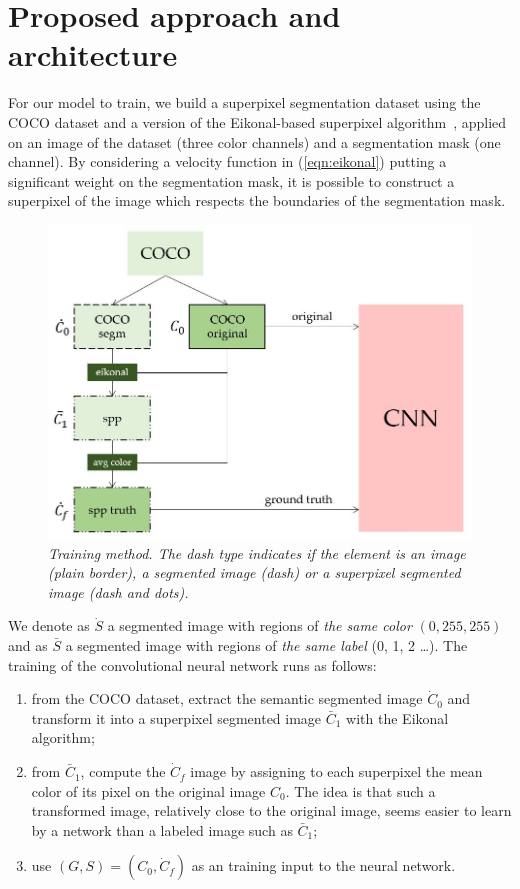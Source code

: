 \documentclass{article}
\begin{document}
\section{Proposed approach and architecture\label{s3}}
    For our model to train, we build a superpixel segmentation dataset using the COCO dataset and a version of the Eikonal-based superpixel algorithm~\cite{figliuzzi2019}, applied on an image of the dataset (three color channels) and a segmentation mask (one channel). By considering a velocity function in (\ref{eqn:eikonal}) putting a significant weight on the segmentation mask, it is possible to construct a superpixel of the image which respects the boundaries of the segmentation mask.
    \begin{figure}[!ht]
        \centering
        \includegraphics[width=.7\linewidth]{pics/schema-train.png}
        \caption{\textit{Training method. The dash type indicates if the element is an image (plain border), a segmented image (dash) or a superpixel segmented image (dash and dots).}}
    \end{figure}
    \par
    We denote as $\dot S$ a segmented image with regions of \textit{the same color} $(0, 255, 255)$  and as $\bar S$ a segmented image with regions of \textit{the same label} (0, 1, 2 \dots). The training of the convolutional neural network runs as follows:
    \begin{enumerate}
        \item from the COCO dataset, extract the semantic segmented image $\dot C_0$ and transform it into a superpixel segmented image $\bar C_1$ with the Eikonal algorithm;
        \item from $\bar C_1$, compute the $\dot C_f$ image by assigning to each superpixel the mean color of its pixel on the original image $C_0$. The idea is that such a transformed image, relatively close to the original image, seems easier to learn by a network than a labeled image such as $\bar C_1$;
        \item use $(G,S)=(C_0, \dot C_f)$ as an training input to the neural network.
    \end{enumerate}
\end{document}
